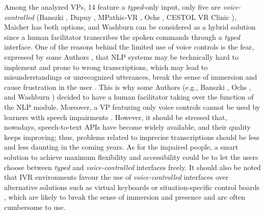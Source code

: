 Among the analyzed VPs, 14 feature a \emph{typed}-only input, only five are \emph{voice-controlled} (Banszki \cite{banszki2018clinical,quail2016student}, Dupuy \cite{dupuy2019virtual}, MPathic-VR \cite{guetterman2019medical,kron2017using}, Ochs \cite{ochs2019training}, CESTOL VR Clinic \cite{sapkaroski2018implementation}), Maicher \cite{maicher2017developing} has both options, and Washburn \cite{washburn2020virtual} can be considered as a hybrid solution since a human facilitator transcribes the spoken commands through a \emph{typed} interface. 
One of the reasons behind the limited use of voice controls is the fear, expressed by some Authors \cite{maicher2017developing,ochs2019training}, that  NLP systems may be technically hard to implement and prone to wrong transcriptions, which may lead to misunderstandings or unrecognized utterances, break the sense of immersion and cause frustration in the user \cite{bloodworth2010initial}.
This is why some Authors (e.g., Banszki \cite{banszki2018clinical,quail2016student}, Ochs \cite{ochs2019training}, and Washburn \cite{washburn2020virtual}) decided to have a human facilitator taking over the function of the NLP module. 
 Moreover, a VP featuring only voice controls cannot be used by learners with speech impairments \cite{maicher2017developing}. However, it should be stressed that, nowadays, speech-to-text APIs have become widely available, and their quality keeps improving; thus, problems related to imprecise transcriptions should be less and less daunting in the coming years. As for the impaired people, a smart solution to achieve maximum flexibility and accessibility could be to let the users  choose between  \emph{typed} and \emph{voice-controlled} interfaces freely. It should also be noted that IVR environments favour the use of \emph{voice-controlled} interfaces over alternative solutions such as virtual keyboards or situation-specific control boards  %
 \cite{sapkaroski2018implementation}, which are likely to break the sense of immersion and presence and are often cumbersome to use.

